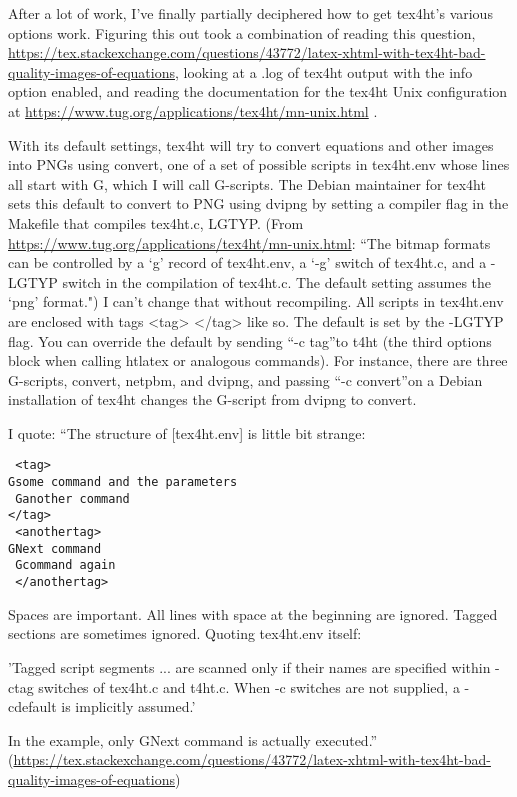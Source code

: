 \documentclass[12pt]{article}
\begin{document}
After a lot of work, I've finally partially deciphered how to get
tex4ht's various options work.  Figuring this out took a combination
of reading this question,
\url{https://tex.stackexchange.com/questions/43772/latex-xhtml-with-tex4ht-bad-quality-images-of-equations},
looking at a .log of tex4ht output with the info option enabled, and
reading the documentation for the tex4ht Unix configuration at
\url{https://www.tug.org/applications/tex4ht/mn-unix.html} .

With its default settings, tex4ht will try to convert equations and
other images into PNGs using convert, one of a set of possible scripts
in tex4ht.env whose lines all start with G, which I will call
G-scripts.  The Debian maintainer for tex4ht sets this default to
convert to PNG using dvipng by setting a compiler flag in the Makefile
that compiles tex4ht.c, LGTYP.  (From
\url{https://www.tug.org/applications/tex4ht/mn-unix.html}: ``The
bitmap formats can be controlled by a ‘g’ record of tex4ht.env, a ‘-g’
switch of tex4ht.c, and a -LGTYP switch in the compilation of
tex4ht.c. The default setting assumes the ‘png’ format.")  I can't
change that without recompiling.  All scripts in tex4ht.env are
enclosed with tags <tag> </tag> like so.  The default is set by the
-LGTYP flag.  You can override the default by sending ``-c tag''to t4ht
(the third options block when calling htlatex or analogous commands).
For instance, there are three G-scripts, convert, netpbm, and dvipng,
and passing ``-c convert''on a Debian installation of tex4ht changes
the G-script from dvipng to convert.

I quote: ``The structure of [tex4ht.env] is little bit strange:

\begin{lstlisting}
 <tag>
Gsome command and the parameters
 Ganother command
</tag>
 <anothertag>
GNext command
 Gcommand again
 </anothertag>
\end{lstlisting}

Spaces are important. All lines with space at the beginning are
ignored. Tagged sections are sometimes ignored. Quoting tex4ht.env
itself:

'Tagged script segments ... are scanned only if their names are
specified within -ctag switches of tex4ht.c and t4ht.c. When -c
switches are not supplied, a -cdefault is implicitly assumed.'

In the example, only GNext command is actually executed.''
(\url{https://tex.stackexchange.com/questions/43772/latex-xhtml-with-tex4ht-bad-quality-images-of-equations})
\end{document}
